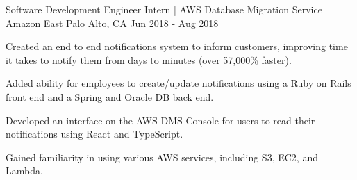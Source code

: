 \begin{cventries}
  \cventry
  {Software Development Engineer Intern | AWS Database Migration Service} %
  {Amazon} %
  {East Palo Alto, CA} %
  {Jun 2018 - Aug 2018} %
  {
    \begin{cvitems} %
      \item {Created an end to end notifications system to inform customers, improving time it takes to notify them from days to minutes (over 57,000\% faster).}
      \item {Added ability for employees to create/update notifications using a Ruby on Rails front end and a Spring and Oracle DB back end.}
      \item {Developed an interface on the AWS DMS Console for users to read their notifications using React and TypeScript.}
      \item {Gained familiarity in using various AWS services, including S3, EC2, and Lambda.}
    \end{cvitems}
  }


\end{cventries}
